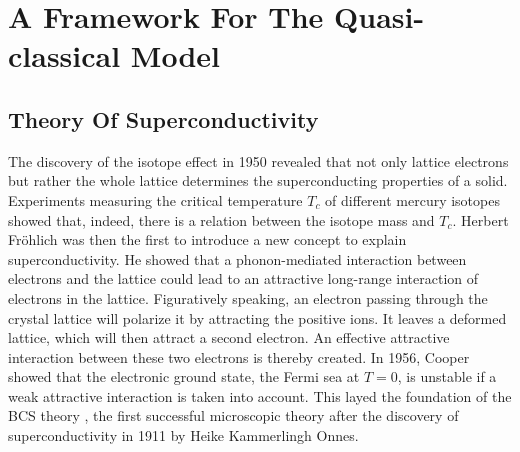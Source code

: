 \chapter{A Framework For The Quasi-classical Model}
\label{ch:basics}

\section{Theory Of Superconductivity}

The discovery of the isotope effect in 1950 revealed that not only lattice electrons but rather the whole lattice determines the superconducting properties of a solid. Experiments measuring the critical temperature $T_c$ of different mercury isotopes showed that, indeed, there is a relation between the isotope mass and $T_c$. Herbert Fr\"ohlich was then the first to introduce a new concept to explain superconductivity. He showed that a phonon-mediated interaction between electrons and the lattice could lead to an attractive long-range interaction of electrons in the lattice. Figuratively speaking, an electron passing through the crystal lattice will polarize it by attracting the positive ions. It leaves a deformed lattice, which will then attract a second electron. An effective attractive interaction between these two electrons is thereby created. %
In 1956, Cooper showed that the electronic ground state, the Fermi sea at $T = 0$, is unstable if a weak attractive interaction is taken into account. This layed the foundation of the BCS theory \cite{Bardeen1957}, the first successful microscopic theory after the discovery of superconductivity in 1911 by Heike Kammerlingh Onnes. 


